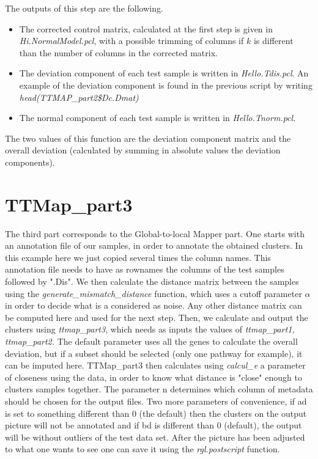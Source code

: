 \documentclass[a4paper,12pt]{article}
\begin{document}
The outputs of this step are the following. 
\begin{itemize}
\item The corrected control matrix, calculated at the first step is given in \textit{Hi.NormalModel.pcl}, with a possible trimming of columns if $k$ is different than the number of columns in the corrected matrix.
\item The deviation component of each test sample is written in \textit{Hello.Tdis.pcl}. An example of the deviation component is found in the previous script by writing \textit{head(TTMAP_part2\$Dc.Dmat)}
\item The normal component of each test sample is written in \textit{Hello.Tnorm.pcl}.
\end{itemize}
The two values of this function are the deviation component matrix and the overall deviation (calculated by summing in absolute values the deviation components).
\section{TTMap\_part3}

The third part corresponds to the Global-to-local Mapper part. One starts with an annotation file of our samples, in order to annotate the obtained clusters. In this example here we just copied several times the column names. This annotation file needs to have as rownames the columns of the test samples followed by ".Dis". We then calculate the distance matrix between the samples using the \textit{generate\_mismatch\_distance} function, which uses a cutoff parameter $\alpha$ in order to decide what is a considered as noise. Any other distance matrix can be computed here and used for the next step. Then, we calculate and output the clusters using \textit{ttmap\_part3}, which needs as inputs the values of \textit{ttmap\_part1, ttmap\_part2.} The default parameter uses all the genes to calculate the overall deviation, but if a subset should be selected (only one pathway for example), it can be imputed here. TTMap_part3 then calculates using \textit{calcul\_e} a parameter of closeness using the data, in order to know what distance is "close" enough to clusters samples together. The parameter n determines which column of metadata should be chosen for the output files.  Two more parameters of convenience, if ad is set to something different than 0 (the default) then the clusters on the output picture will not be annotated and if bd is different than 0 (default), the output will be without outliers of the test data set. After the picture has been adjusted to what one wants to see one can save it using the \textit{rgl.postscript} function.
\end{document}
